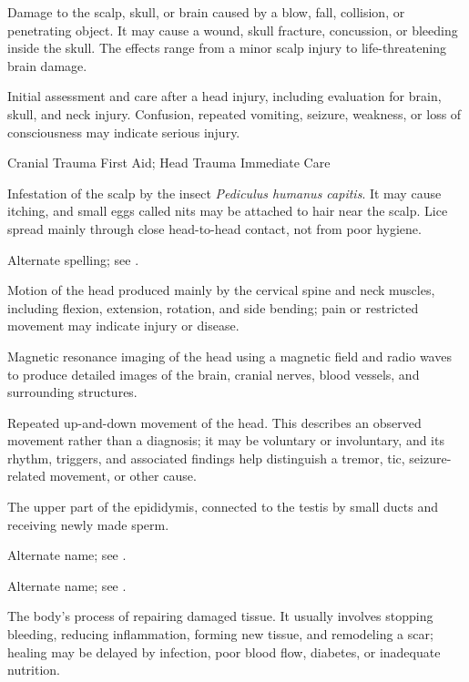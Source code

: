  Damage to the scalp, skull, or brain caused by a blow, fall, collision, or penetrating object. It may cause a wound, skull fracture, concussion, or bleeding inside the skull. The effects range from a minor scalp injury to life-threatening brain damage.

 Initial assessment and care after a head injury, including evaluation for brain, skull, and neck injury. Confusion, repeated vomiting, seizure, weakness, or loss of consciousness may indicate serious injury.

\synonyms
Cranial Trauma First Aid; Head Trauma Immediate Care

 Infestation of the scalp by the insect \textit{Pediculus humanus capitis}. It may cause itching, and small eggs called nits may be attached to hair near the scalp. Lice spread mainly through close head-to-head contact, not from poor hygiene.

 Alternate spelling; see .

 Motion of the head produced mainly by the cervical spine and neck muscles, including flexion, extension, rotation, and side bending; pain or restricted movement may indicate injury or disease.

 Magnetic resonance imaging of the head using a magnetic field and radio waves to produce detailed images of the brain, cranial nerves, blood vessels, and surrounding structures.

 Repeated up-and-down movement of the head. This describes an observed movement rather than a diagnosis; it may be voluntary or involuntary, and its rhythm, triggers, and associated findings help distinguish a tremor, tic, seizure-related movement, or other cause.

 The upper part of the epididymis, connected to the testis by small ducts and receiving newly made sperm.

 Alternate name; see .

 Alternate name; see .

 The body’s process of repairing damaged tissue. It usually involves stopping bleeding, reducing inflammation, forming new tissue, and remodeling a scar; healing may be delayed by infection, poor blood flow, diabetes, or inadequate nutrition.


